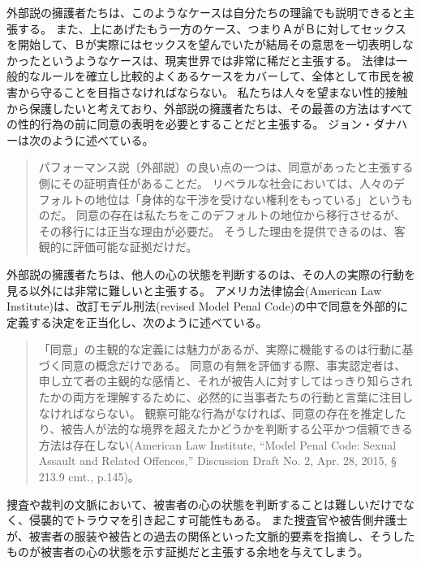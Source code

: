 \documentclass[paper=a4,book,openany]{jlreq}
\begin{document}
外部説の擁護者たちは、このようなケースは自分たちの理論でも説明できると主張する。
また、上にあげたもう一方のケース、つまりＡがＢに対してセックスを開始して、Ｂが実際にはセックスを望んでいたが結局その意思を一切表明しなかったというようなケースは、現実世界では非常に稀だと主張する。
法律は一般的なルールを確立し比較的よくあるケースをカバーして、全体として市民を被害から守ることを目指さなければならない。
私たちは人々を望まない性的接触から保護したいと考えており、外部説の擁護者たちは、その最善の方法はすべての性的行為の前に同意の表明を必要とすることだと主張する。
ジョン・ダナハーは次のように述べている。

\begin{quote}
  パフォーマンス説〔外部説〕の良い点の一つは、同意があったと主張する側にその証明責任があることだ。
リベラルな社会においては、人々のデフォルトの地位は「身体的な干渉を受けない権利をもっている」というものだ。
同意の存在は私たちをこのデフォルトの地位から移行させるが、その移行には正当な理由が必要だ。
そうした理由を提供できるのは、客観的に評価可能な証拠だけだ。
\citep{danaher13:_some_notes_consen_sexual_offen_part_one}
\end{quote}

外部説の擁護者たちは、他人の心の状態を判断するのは、その人の実際の行動を見る以外には非常に難しいと主張する。
アメリカ法律協会(American Law Institute)は、改訂モデル刑法(revised Model Penal Code)の中で同意を外部的に定義する決定を正当化し、次のように述べている。

\begin{quote}
「同意」の主観的な定義には魅力があるが、実際に機能するのは行動に基づく同意の概念だけである。
同意の有無を評価する際、事実認定者は、申し立て者の主観的な感情と、それが被告人に対すしてはっきり知らされたかの両方を理解するために、必然的に当事者たちの行動と言葉に注目しなければならない。
観察可能な行為がなければ、同意の存在を推定したり、被告人が法的な境界を超えたかどうかを判断する公平かつ信頼できる方法は存在しない(American Law  Institute, ``Model Penal Code: Sexual Assault and Related Offences,'' Discussion Draft No. 2, Apr. 28, 2015, § 213.9 cmt., p.145)。
\end{quote}

捜査や裁判の文脈において、被害者の心の状態を判断することは難しいだけでなく、侵襲的でトラウマを引き起こす可能性もある。
また捜査官や被告側弁護士が、被害者の服装や被告との過去の関係といった文脈的要素を指摘し、そうしたものが被害者の心の状態を示す証拠だと主張する余地を与えてしまう。
\end{document}
